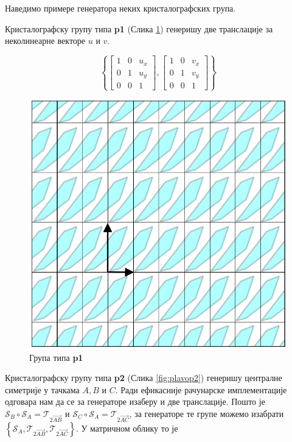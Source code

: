 \documentclass[12pt]{article}
\begin{document}
Наведимо примере генератора неких кристалографских група.





Кристалографску групу типа \textbf{p1}  (Слика \ref{fig:plavop1}) генеришу две транслације за неколинеарне векторе ${u}$ и ${v}$.

$$\left\{\begin{bmatrix}1 & 0 & u_x\\ 0 & 1&u_y \\ 0 & 0 & 1\end{bmatrix},  \begin{bmatrix}1 & 0 & v_x\\ 0 & 1&v_y \\ 0 & 0 & 1\end{bmatrix}\right\} $$

\begin{figure}[H]
\centering
    \includegraphics[width=.3\textwidth]{strelica_p1.png}
    
    \caption{Група типа \textbf{p1}}
    \label{fig:plavop1}
  \end{figure}



Кристалографску групу типа \textbf{p2} (Слика \ref{fig:plavop2}) генеришу централне симетрије у тачкама $A,B$ и $C$. Ради ефикасније рачунарске имплементације одговара нам да се за генераторе изаберу и две транслације. 
Пошто је $\mathcal{S}_B \circ \mathcal{S}_A = \mathcal{T}_{2\overrightarrow{AB}} $ и $\mathcal{S}_C \circ \mathcal{S}_A = \mathcal{T}_{2\overrightarrow{AC}} $, за генераторе те групе можемо изабрати $\left\{ \mathcal{S}_A , \mathcal{T}_{2\overrightarrow{AB}}, \mathcal{T}_{2\overrightarrow{AC}} \right\} $. 
У матричном облику то је 
\end{document}
